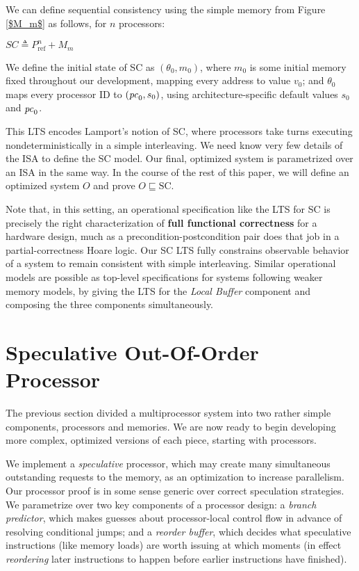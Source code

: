 We can define sequential consistency using the simple memory from Figure
\ref{$M_m$} as follows, for $n$ processors:
\begin{defn}
$SC \triangleq P^n_\text{ref} + M_m$
\label{sc}
\end{defn}

We define the initial state of SC as $(\theta_0, m_0)$, where $m_0$ is
some initial memory fixed throughout our development, mapping every
address to value $v_0$; and $\theta_0$ maps every processor ID to
$(\mathit{pc}_0, s_0)$, using architecture-specific default values $s_0$ and
$\mathit{pc}_0$.

This LTS encodes Lamport's notion of SC, where processors take turns executing
nondeterministically in a simple interleaving.  We need know very few details
of the ISA to define the SC model.  Our final, optimized system is parametrized
over an ISA in the same way.  In the course of the rest of this paper, we will
define an optimized system $O$ and prove $O \sqsubseteq \text{SC}$.

Note that, in this setting, an operational specification like the LTS
for SC is precisely the right characterization of \textbf{full functional
  correctness} for a hardware design, much as a
precondition-postcondition pair does that job in a partial-correctness
Hoare logic.  Our SC LTS fully constrains observable behavior of a
system to remain consistent with simple interleaving.  Similar
operational models are possible as top-level specifications for
systems following weaker memory models, by giving the LTS for the \emph{Local
Buffer} component and composing the three components simultaneously.


\section{Speculative Out-Of-Order Processor}\label{sec:ooo}

The previous section divided a multiprocessor system into two rather
simple components, processors and memories.  We are now ready to begin
developing more complex, optimized versions of each piece, starting
with processors.

We implement a \emph{speculative} processor, which may create many
simultaneous outstanding requests to the memory, as an optimization to
increase parallelism.  Our processor proof is in some sense generic
over correct speculation strategies.  We parametrize over two key
components of a processor design: a \emph{branch predictor}, which
makes guesses about processor-local control flow in advance of
resolving conditional jumps; and a
\emph{reorder buffer}, which decides what speculative instructions (like memory loads)
are worth issuing at which moments (in effect \emph{reordering} later
instructions to happen before earlier instructions have finished).

